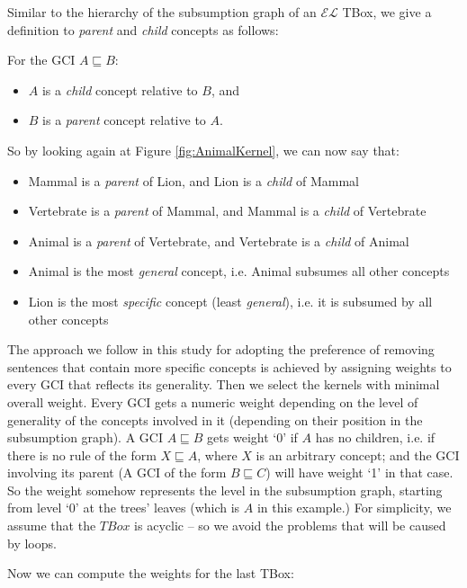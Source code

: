 Similar to the hierarchy of the subsumption graph of an $\mathcal{EL}$ TBox, we give a definition to \textit{parent} and \textit{child} concepts as follows:
\begin{defn}
\label{defn:Parent-Child}
For the GCI $A \sqsubseteq B$:
\begin{itemize}
\item $A$ is a \textit{child} concept relative to $B$, and
\item $B$ is a \textit{parent} concept relative to $A$.\\
\end{itemize}
\end{defn}

So by looking again at Figure \ref{fig:AnimalKernel}, we can now say that:
\begin{itemize}
\item Mammal is a \textit{parent} of Lion, and Lion is a \textit{child} of Mammal
\item Vertebrate is a \textit{parent} of Mammal, and Mammal is a \textit{child} of Vertebrate
\item Animal is a \textit{parent} of Vertebrate, and Vertebrate is a \textit{child} of Animal
\item Animal is the most \textit{general} concept, i.e. Animal subsumes all other concepts
\item Lion is the most \textit{specific} concept (least \textit{general}), i.e. it is subsumed by all other concepts
\end{itemize}

The approach we follow in this study for adopting the preference of removing sentences that contain more specific concepts is achieved by assigning weights to every GCI that reflects its generality. Then we select the kernels with minimal overall weight. Every GCI gets a numeric weight depending on the level of generality of the concepts involved in it (depending on their position in the subsumption graph). A GCI $A \sqsubseteq B$ gets weight `0' if $A$ has no children, i.e. if there is no rule of the form $X \sqsubseteq A$, where $X$ is an arbitrary concept; and the GCI involving its parent (A GCI of the form $B \sqsubseteq C$) will have weight `1' in that case. So the weight somehow represents the level in the subsumption graph, starting from level `0' at the trees' leaves (which is $A$ in this example.) For simplicity, we assume that the $TBox$ is acyclic -- so we avoid the problems that will be caused by loops.

Now we can compute the weights for the last TBox:

